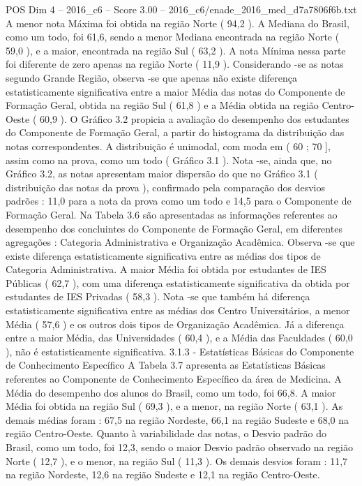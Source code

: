 \begin{textsample}{POS Dim 4 – 2016\_c6 – Score 3.00 – 2016\_c6/enade\_2016\_med\_d7a7806f6b.txt}
A menor nota Máxima foi obtida na região Norte ( 94,2 ).
A Mediana do Brasil, como um todo, foi 61,6, sendo a menor Mediana encontrada na região Norte ( 59,0 ), e a maior, encontrada na região Sul ( 63,2 ).
A nota Mínima nessa parte foi diferente de zero apenas na região Norte ( 11,9 ).
Considerando -se as notas segundo Grande Região, observa -se que apenas não existe diferença estatisticamente significativa entre a maior Média das notas do Componente de Formação Geral, obtida na região Sul ( 61,8 ) e a Média obtida na região Centro-Oeste ( 60,9 ).
O Gráfico 3.2 propicia a avaliação do desempenho dos estudantes do Componente de Formação Geral, a partir do histograma da distribuição das notas correspondentes.
A distribuição é unimodal, com moda em ( 60 ; 70 ], assim como na prova, como um todo ( Gráfico 3.1 ).
Nota -se, ainda que, no Gráfico 3.2, as notas apresentam maior dispersão do que no Gráfico 3.1 ( distribuição das notas da prova ), confirmado pela comparação dos desvios padrões : 11,0 para a nota da prova como um todo e 14,5 para o Componente de Formação Geral.
Na Tabela 3.6 são apresentadas as informações referentes ao desempenho dos concluintes do Componente de Formação Geral, em diferentes agregações : Categoria Administrativa e Organização Acadêmica.
Observa -se que existe diferença estatisticamente significativa entre as médias dos tipos de Categoria Administrativa.
A maior Média foi obtida por estudantes de IES Públicas ( 62,7 ), com uma diferença estatisticamente significativa da obtida por estudantes de IES Privadas ( 58,3 ).
Nota -se que também há diferença estatisticamente significativa entre as médias dos Centro Universitários, a menor Média ( 57,6 ) e os outros dois tipos de Organização Acadêmica.
Já a diferença entre a maior Média, das Universidades ( 60,4 ), e a Média das Faculdades ( 60,0 ), não é estatisticamente significativa. 3.1.3 - Estatísticas Básicas do Componente de Conhecimento Específico A Tabela 3.7 apresenta as Estatísticas Básicas referentes ao Componente de Conhecimento Específico da área de Medicina.
A Média do desempenho dos alunos do Brasil, como um todo, foi 66,8.
A maior Média foi obtida na região Sul ( 69,3 ), e a menor, na região Norte ( 63,1 ).
As demais médias foram : 67,5 na região Nordeste, 66,1 na região Sudeste e 68,0 na região Centro-Oeste.
Quanto à variabilidade das notas, o Desvio padrão do Brasil, como um todo, foi 12,3, sendo o maior Desvio padrão observado na região Norte ( 12,7 ), e o menor, na região Sul ( 11,3 ).
Os demais desvios foram : 11,7 na região Nordeste, 12,6 na região Sudeste e 12,1 na região Centro-Oeste.

\end{textsample}
